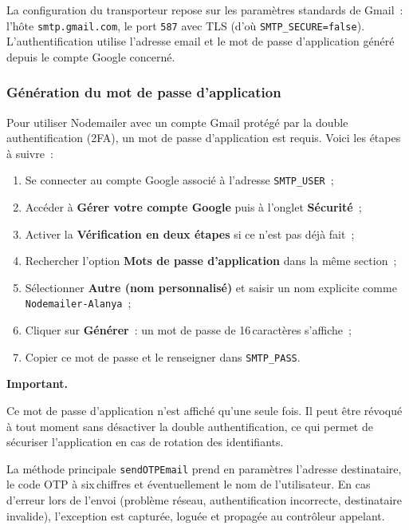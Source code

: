 \documentclass[11pt,a4paper,oneside]{report}
\newenvironment{note}[1][Note]{%
  \begin{tcolorbox}[enhanced, frame hidden, interior hidden,
    borderline west={3pt}{0pt}{AlanyaIndigo},
    left=10pt, top=3pt, bottom=3pt, sharp corners, colback=white,
    before skip=\medskipamount, after skip=\medskipamount]%
  \small\textbf{\textcolor{AlanyaIndigoDark}{#1.}}\space\ignorespaces
}{\end{tcolorbox}}
\begin{document}
La configuration du transporteur repose sur les param\`{e}tres standards de Gmail~:
l'h\^{o}te \texttt{smtp.gmail.com}, le port \texttt{587} avec TLS (d'o\`{u}
\texttt{SMTP\_SECURE=false}). L'authentification utilise l'adresse email et le mot
de passe d'application g\'{e}n\'{e}r\'{e} depuis le compte Google concern\'{e}.

\subsubsection{G\'{e}n\'{e}ration du mot de passe d'application}
Pour utiliser Nodemailer avec un compte Gmail prot\'{e}g\'{e} par la double authentification
(2FA), un mot de passe d'application est requis. Voici les \'{e}tapes \`{a} suivre~:
\begin{enumerate}
  \item Se connecter au compte Google associ\'{e} \`{a} l'adresse \texttt{SMTP\_USER}~;
  \item Acc\'{e}der \`{a} \textbf{G\'{e}rer votre compte Google} puis \`{a} l'onglet
        \textbf{S\'{e}curit\'{e}}~;
  \item Activer la \textbf{V\'{e}rification en deux \'{e}tapes} si ce n'est pas d\'{e}j\`{a} fait~;
  \item Rechercher l'option \textbf{Mots de passe d'application} dans la m\^{e}me section~;
  \item S\'{e}lectionner \textbf{Autre (nom personnalis\'{e})} et saisir un nom explicite
        comme \texttt{Nodemailer-Alanya}~;
  \item Cliquer sur \textbf{G\'{e}n\'{e}rer}~: un mot de passe de 16\,caract\`{e}res s'affiche~;
  \item Copier ce mot de passe et le renseigner dans \texttt{SMTP\_PASS}.
\end{enumerate}

\begin{note}[Important]
Ce mot de passe d'application n'est affich\'{e} qu'une seule fois. Il peut \^{e}tre
r\'{e}voqu\'{e} \`{a} tout moment sans d\'{e}sactiver la double authentification, ce qui
permet de s\'{e}curiser l'application en cas de rotation des identifiants.
\end{note}

La m\'{e}thode principale \texttt{sendOTPEmail} prend en param\`{e}tres l'adresse
destinataire, le code OTP \`{a} six\,chiffres et \'{e}ventuellement le nom de
l'utilisateur. En cas d'erreur lors de l'envoi (probl\`{e}me r\'{e}seau, authentification
incorrecte, destinataire invalide), l'exception est captur\'{e}e, logu\'{e}e et
propag\'{e}e au contr\^{o}leur appelant.
\end{document}

